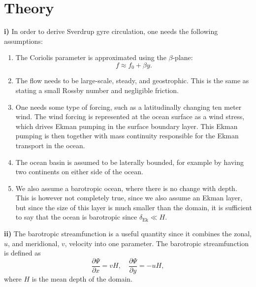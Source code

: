 \section{Theory}
\textbf{i)} In order to derive Sverdrup gyre circulation, one needs the following assumptions:
\begin{enumerate}
    \item The Coriolis parameter is approximated using the $\beta$-plane:
    $$f \approx f_0 + \beta y.$$

    \item The flow needs to be large-scale, steady, and geostrophic. This is the same as stating a small Rossby number and negligible friction.

    \item One needs some type of forcing, such as a latitudinally changing ten meter wind. The wind forcing is represented at the ocean surface as a wind stress, which drives Ekman pumping in the surface boundary layer. This Ekman pumping is then together with mass continuity responsible for the Ekman transport in the ocean. 

    \item The ocean basin is assumed to be laterally bounded, for example by having two continents on either side of the ocean.

    \item We also assume a barotropic ocean, where there is no change with depth. This is however not completely true, since we also assume an Ekman layer, but since the size of this layer is much smaller than the domain, it is sufficient to say that the ocean is barotropic since $\delta_\text{Ek}\ll H$.
\end{enumerate}

\textbf{ii)} The barotropic streamfunction is a useful quantity since it combines the zonal, $u$, and meridional, $v$, velocity into one parameter. The barotropic streamfunction is defined as 
\begin{equation}
    \frac{\partial \Psi}{\partial x}=vH, \quad \frac{\partial \Psi}{\partial 
    y}=-uH,
\end{equation}
where $H$ is the mean depth of the domain.

